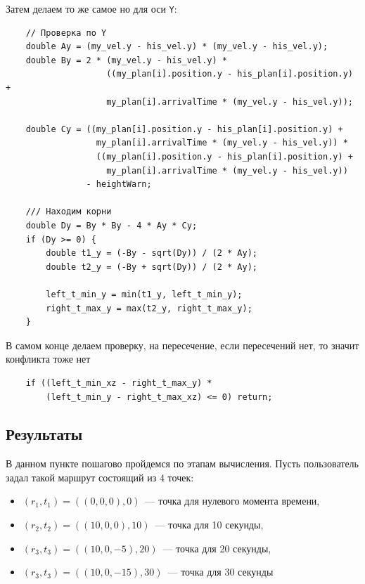 \documentclass[a4paper,12pt]{article}
\numberwithin{figure}{subsubsection}
\begin{document}
Затем делаем то же самое но для оси \texttt{Y}:
\begin{verbatim}
    // Проверка по Y
    double Ay = (my_vel.y - his_vel.y) * (my_vel.y - his_vel.y);
    double By = 2 * (my_vel.y - his_vel.y) * 
                    ((my_plan[i].position.y - his_plan[i].position.y) +
                    my_plan[i].arrivalTime * (my_vel.y - his_vel.y));
    
    double Cy = ((my_plan[i].position.y - his_plan[i].position.y) +
                  my_plan[i].arrivalTime * (my_vel.y - his_vel.y)) *
                  ((my_plan[i].position.y - his_plan[i].position.y) + 
                    my_plan[i].arrivalTime * (my_vel.y - his_vel.y))
                - heightWarn;
    
    /// Находим корни
    double Dy = By * By - 4 * Ay * Cy;
    if (Dy >= 0) {
        double t1_y = (-By - sqrt(Dy)) / (2 * Ay);
        double t2_y = (-By + sqrt(Dy)) / (2 * Ay);
    
        left_t_min_y = min(t1_y, left_t_min_y);
        right_t_max_y = max(t2_y, right_t_max_y);
    }
\end{verbatim}
В самом конце делаем проверку, на пересечение, если пересечений нет, то значит конфликта тоже нет
\begin{verbatim}
    if ((left_t_min_xz - right_t_max_y) * 
        (left_t_min_y - right_t_max_xz) <= 0) return;
\end{verbatim}

\subsection{Результаты}

В данном пункте пошагово пройдемся по этапам вычисления. Пусть пользователь задал такой маршрут состоящий из 4 точек: 
\begin{itemize}
    \item $(r_1,t_1) = ((0,0,0),0)$~--- точка для нулевого момента времени,
    \item $(r_2,t_2) = ((10,0,0),10)$~--- точка для 10 секунды,
    \item $(r_3,t_3) = ((10,0,-5),20)$~--- точка для 20 секунды,
    \item $(r_3,t_3) = ((10,0,-15),30)$~--- точка для 30 секунды
\end{itemize}
\end{document}
